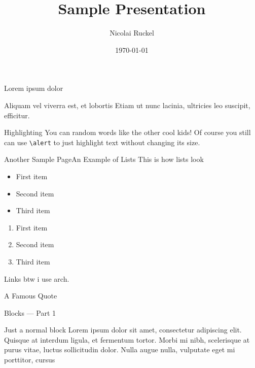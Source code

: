 \documentclass[17pt,aspectratio=169]{beamer}
\title{Sample Presentation}
\author{Nicolai Ruckel}
\date{\today}
\begin{document}
\begin{frame}
  \titlepage
\end{frame}

\begin{frame}{}{}
  \Huge Lorem ipsum dolor\par
  \Large Aliquam vel viverra est, et lobortis
  \vfill
  \flushright
  \normalsize Etiam ut nunc lacinia, ultricies leo suscipit, efficitur.
\end{frame}

\begin{frame}{Highlighting}{}
  \Large
  You can  random words like  the other cool kids!
  \vfill\normalsize
  Of course you still can use \texttt{\textbackslash alert} to just
  \alert{highlight} text without changing its size.
\end{frame}

\begin{frame}{Another Sample Page}{An Example of Lists}
  This is how lists look
  \begin{itemize}
    \item First item
    \item Second item
    \item Third item
  \end{itemize}
  \begin{enumerate}
    \item First item
    \item Second item
    \item Third item
  \end{enumerate}
\end{frame}

\begin{frame}{Links}
  btw i use arch\footnotemark.
\end{frame}

\begin{frame}{A Famous Quote}
\end{frame}

\begin{frame}{Blocks --- Part 1}
  \begin{block}{Just a normal block}
    Lorem ipsum dolor sit amet, consectetur adipiscing elit. Quisque at interdum
    ligula, et fermentum tortor. Morbi mi nibh, scelerisque at purus vitae,
    luctus sollicitudin dolor. Nulla augue nulla, vulputate eget mi porttitor,
    cursus
  \end{block}
\end{frame}
\end{document}
